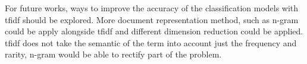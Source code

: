For future works, ways to improve the accuracy of the classification models with \ac{tfidf} should be explored. More document representation method, such as n-gram could be apply alongside \ac{tfidf} and different dimension reduction could be applied. \Ac{tfidf} does not take the semantic of the term into account just the frequency and rarity, n-gram would be able to rectify part of the problem.\\
